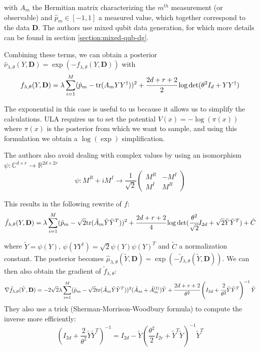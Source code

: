 \documentclass[12pt]{memoir}
\newcommand{\tr}{\text{tr}}
\newcommand{\mb}{\mathbf}
\begin{document}
with $A_m$ the Hermitian matrix characterizing the $m^{th}$ measurement (or observable) and $\hat p_m \in [-1, 1]$ a measured value, which together correspond to the data $\mb D$. The authors use mixed qubit data generation, for which more details can be found in section \ref{section:mixed-qub-dg}. \medbreak

Combining these terms, we can obtain a posterior $\hat \nu_{\lambda, \theta}(Y, \mb D) = \exp(-f_{\lambda, \theta}(Y, \mb D))$ with
\begin{equation}
    f_{\lambda, \theta}(Y, \mb D) = \lambda \sum^{M}_{i=1} (\hat p_m - \tr(A_mYY^\dagger))^2 + \cfrac{2d + r + 2}{2}\log \det(\theta^2I_d + YY^\dagger)
\end{equation}

The exponential in this case is useful to us because it allows us to simplify the calculations. ULA requires us to set the potential $V(x) = -\log(\pi(x))$ where $\pi(x)$ is the posterior from which we want to sample, and using this formulation we obtain a $\log(\exp)$ simplification.\medbreak

The authors also avoid dealing with complex values by using an isomorphism $\psi: \mathbb{C}^{d\times r}\rightarrow \mathbb{R}^{2d\times 2r}$
\begin{equation}
\psi: M^R + iM^I \rightarrow \frac{1}{\sqrt 2} \begin{pmatrix}

    M^R & - M^I\\

    M^I & M^R

\end{pmatrix}
\end{equation}


This results in the following rewrite of $f$:
\begin{equation}    
\tilde f_{\lambda, \theta}(Y, \mb D) = \lambda \sum^{M}_{i=1} (\hat p_m - \sqrt{2}\tr(\tilde A_m \tilde Y \tilde Y^{T}))^2 + \cfrac{2d + r + 2}{4}\log \det(\cfrac{\theta^2}{\sqrt 2}I_{2d} + \sqrt 2 \tilde Y \tilde Y^{T}) + \tilde C
\end{equation}


where $\tilde Y = \psi(Y)$, $\psi(YY^\dagger) = \sqrt{2} \psi(Y)\psi(Y)^{T}$ and $\tilde C$ a normalization constant. The posterior becomes $\hat \mu_{\lambda, \theta}(\tilde Y, \mb D) =\exp(-\tilde f_{\lambda, \theta}(\tilde Y, \mb D))$. We can then also obtain the gradient of $\tilde f_{\lambda, \theta}$:
\begin{equation}
\nabla \tilde f_{\lambda, \theta}(\tilde Y, \mb D) = -2\sqrt 2 \lambda \sum^{M}_{i=1} (\hat p_m - \sqrt{2}\tr(\tilde A_m \tilde Y \tilde Y^{T}))^2 (\tilde A_m + \tilde A^{(t)}_m)\tilde Y + \cfrac{2d + r + 2}{\theta^2} \left(I_{2d} + \cfrac{2}{\theta^2}\tilde Y \tilde Y^{T}\right)^{-1} \tilde Y
\end{equation}
They also use a trick (Sherman-Morrison-Woodbury formula) to compute the inverse more efficiently:
\begin{equation}
\left( I_{2d} + \frac{2}{\theta^2} \tilde Y \tilde Y^{T} \right)^{-1} =  I_{2d} - \tilde Y \left( \frac{\theta^2}{2} I_{2r}+\tilde Y^{T} \tilde Y \right)^{-1} \tilde Y^{T}
\end{equation}
\end{document}
